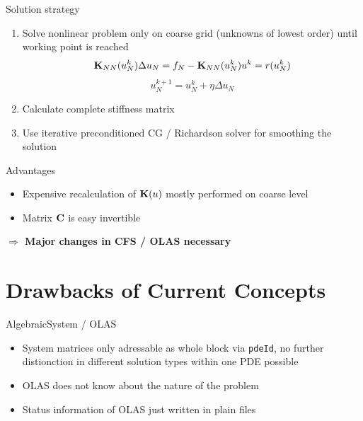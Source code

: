 \documentclass[10pt]{beamer}
\begin{document}
\begin{frame}[fragile]{Solution strategy}
 \begin{enumerate}
  \item Solve nonlinear problem only on coarse grid (unknowns of lowest order)
until working point is reached 
\[ \displaystyle
{\bf K}_{NN}(u_N^k) \Delta u_N = f_N - {\bf K}_{NN}(u_{N}^k) u^k = r(u_N^k)
\]
\[ \displaystyle
u^{k+1}_N = u^k_{N} + \eta \Delta u_N
\]
\item Calculate complete stiffness matrix
\item Use iterative preconditioned CG / Richardson solver for smoothing the
solution
 \end{enumerate}
\begin{block}{Advantages}
\begin{itemize}
\item Expensive recalculation of ${\bf K}(u)$ mostly performed on coarse level
\item Matrix $\bf{C}$ is easy invertible
\end{itemize}
\end{block}
{\bf $\Rightarrow$ Major changes in CFS / OLAS necessary}
\end{frame}




\section{Drawbacks of Current Concepts}
\begin{frame}[fragile]{AlgebraicSystem / OLAS}
  \begin{itemize}
  \item System matrices only adressable as whole block via \verb+pdeId+, no further distionction in different solution types within one PDE possible
  \item OLAS does not know about the nature of the problem
  \item Status information of OLAS just written in plain files
  \end{itemize}
\end{frame}

\end{document}
